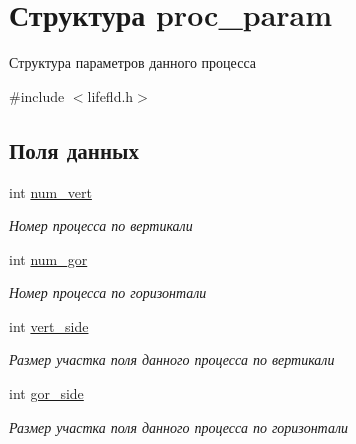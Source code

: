\hypertarget{structproc__param}{}\section{Структура proc\+\_\+param}
\label{structproc__param}


Структура параметров данного процесса  




{\ttfamily \#include $<$lifefld.\+h$>$}

\subsection*{Поля данных}
\begin{DoxyCompactItemize}
\item 
int \hyperlink{structproc__param_a9072610d26440867757053b0511091df}{num\+\_\+vert}\hypertarget{structproc__param_a9072610d26440867757053b0511091df}{}\label{structproc__param_a9072610d26440867757053b0511091df}

\begin{DoxyCompactList}\small\item\em Номер процесса по вертикали \end{DoxyCompactList}\item 
int \hyperlink{structproc__param_ab98bd982bcef064d742eaad7405b75fa}{num\+\_\+gor}\hypertarget{structproc__param_ab98bd982bcef064d742eaad7405b75fa}{}\label{structproc__param_ab98bd982bcef064d742eaad7405b75fa}

\begin{DoxyCompactList}\small\item\em Номер процесса по горизонтали \end{DoxyCompactList}\item 
int \hyperlink{structproc__param_aa451c5f2cadd3053a3fb92db509345d2}{vert\+\_\+side}\hypertarget{structproc__param_aa451c5f2cadd3053a3fb92db509345d2}{}\label{structproc__param_aa451c5f2cadd3053a3fb92db509345d2}

\begin{DoxyCompactList}\small\item\em Размер участка поля данного процесса по вертикали \end{DoxyCompactList}\item 
int \hyperlink{structproc__param_aa38bc3a4369ecb19504a1bbeb65c0fd7}{gor\+\_\+side}\hypertarget{structproc__param_aa38bc3a4369ecb19504a1bbeb65c0fd7}{}\label{structproc__param_aa38bc3a4369ecb19504a1bbeb65c0fd7}

\begin{DoxyCompactList}\small\item\em Размер участка поля данного процесса по горизонтали \end{DoxyCompactList}\end{DoxyCompactItemize}


